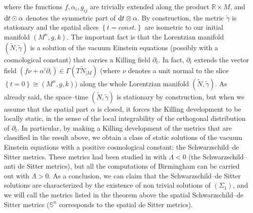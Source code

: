 \documentclass[a4paper,11pt,leqno]{amsart}
\numberwithin{equation}{section}
\theoremstyle{main}
\begin{document}
where the functions $f, \alpha_i , g_{ij}$ are trivially extended along the product  ${{\mathbb R}}\times M$, and ${{\rm d}} t\odot \alpha$ denotes the symmetric part of ${{\rm d}} t\otimes \alpha$. By construction, the metric $\tilde{\gamma}$ is stationary and the spatial slices $\left\{t=const.\right\}$ are isometric to our initial manifold $(M^n,g,k)$. The important fact is that the Lorentzian manifold $(\tilde{N},\tilde{\gamma})$ is a solution of the vacuum Einstein equations (possibly with a cosmological constant) that carries a Killing field $\partial_t$. In fact, $\partial_t$ extends the vector field $(f\nu+ \alpha^i\partial_i) \in \Gamma(T\tilde{N}_{|M})$ (where $\nu$ denotes a unit normal to the slice $\left\{t=0\right\}\cong (M^n,g,k)$) along the whole Lorentzian manifold $(\tilde{N},\tilde{\gamma})$. As already said, the space--time $(\tilde{N},\tilde{\gamma})$ is stationary by construction, but when we assume that the spatial part $\alpha$ is closed, it forces the Killing development to be locally static, in the sense of the local integrability of the orthogonal distribution of $\partial_t$. In particular, by making a Killing development of the metrics that are classified in the result above, we obtain a class of static solutions of the vacuum Einstein equations with a positive cosmological constant: the Schwarzschild--de Sitter metrics. These metrics had been studied in \cite{Bir} with $\Lambda<0$ (the Schwarzschild--anti de Sitter metrics), but all the computations of Birmingham can be carried out with $\Lambda>0$. As a conclusion, we can claim that the Schwarzschild--de Sitter solutions are characterized by the existence of non trivial solutions of $(\Sigma_1)$, and we will call the metrics listed in the theorem above the spatial Schwarzschild--de Sitter metrics (${{\mathbb S^{n}}}$ corresponds to the spatial de Sitter metrics).\\
\end{document}
